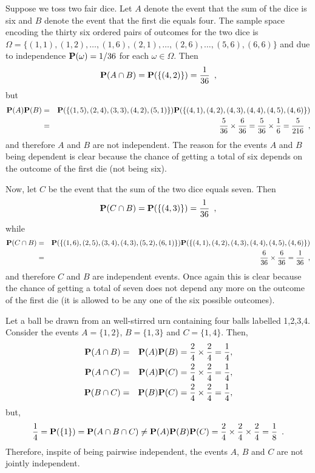 \begin{example} 
Suppose we toss two fair dice.  
Let $A$ denote the event that the sum of the dice is six and $B$ denote the event that the first die equals four.  The sample space encoding the thirty six ordered pairs of outcomes for the two dice is $\Omega = \{ (1,1), (1,2), \ldots, (1,6), (2,1), \ldots, (2,6), \ldots, (5,6), (6,6)\}$ and due to independence $\mathbf{P}(\omega)=1/36$ for each $\omega\in\Omega$.  
Then 
\[
\mathbf{P}(A \cap B)  = \mathbf{P} (\{(4,2)\}) = \frac{1}{36} \enspace ,
\]
but
\begin{eqnarray*}
\mathbf{P}(A)\mathbf{P}(B) 
&=& \mathbf{P} (\{(1,5),(2,4),(3,3),(4,2),(5,1)\}) \mathbf{P}( \{ (4,1),(4,2),(4,3),(4,4),(4,5),(4,6) \}) \\
&=& \frac{5}{36}\times \frac{6}{36} = \frac{5}{36}\times\frac{1}{6} = \frac{5}{216} \enspace ,
\end{eqnarray*}
and therefore $A$ and $B$ are not independent.  
The reason for the events $A$ and $B$ being dependent is clear because the chance of getting a total of six depends on the outcome of the first die (not being six).

Now, let $C$ be the event that the sum of the two dice equals seven.  
Then
\[
\mathbf{P}(C \cap B)  = \mathbf{P} (\{(4,3)\}) = \frac{1}{36} \enspace ,
\]
while
\begin{eqnarray*}
\mathbf{P}(C \cap B)  
&=& \mathbf{P} (\{(1,6),(2,5),(3,4),(4,3),(5,2),(6,1)\}) \mathbf{P}( \{ (4,1),(4,2),(4,3),(4,4),(4,5),(4,6) \})\\
&=& \frac{6}{36}\times\frac{6}{36}= \frac{1}{36} \enspace ,
\end{eqnarray*}
and therefore $C$ and $B$ are independent events.  Once again this is clear because the chance of getting a total of seven does not depend any more on the outcome of the first die (it is allowed to be any one of the six possible outcomes). 
\end{example}

\begin{example}
Let a ball be drawn from an well-stirred urn containing four balls labelled 1,2,3,4.  
Consider the events $A = \{1,2\}$, $B=\{1,3\}$ and $C=\{1,4\}$.  
Then,
\begin{eqnarray*}
\mathbf{P}(A \cap B) &=& \mathbf{P}(A)\mathbf{P}(B) = \frac{2}{4}\times\frac{2}{4} = \frac{1}{4},\\
\mathbf{P}(A \cap C) &=& \mathbf{P}(A)\mathbf{P}(C) = \frac{2}{4}\times\frac{2}{4} = \frac{1}{4},\\
\mathbf{P}(B \cap C) &=& \mathbf{P}(B)\mathbf{P}(C) = \frac{2}{4}\times\frac{2}{4} = \frac{1}{4},
\end{eqnarray*}
but,
\[
\frac{1}{4} = \mathbf{P}(\{1\}) = \mathbf{P} (A \cap B \cap C) \neq \mathbf{P}(A)\mathbf{P}(B)\mathbf{P}(C) = \frac{2}{4}\times\frac{2}{4}\times\frac{2}{4}=\frac{1}{8} \enspace .
\]
Therefore, inspite of being pairwise independent, the events $A$, $B$ and $C$ are not jointly independent.
\end{example}

